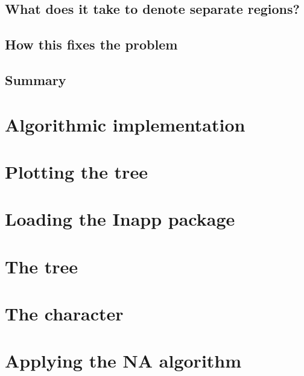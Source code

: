 \documentclass[]{book}
\theoremstyle{definition}
\theoremstyle{definition}
\theoremstyle{definition}
\theoremstyle{remark}
\begin{document}
\hypertarget{what-does-it-take-to-denote-separate-regions}{%
\subsection{What does it take to denote separate
regions?}\label{what-does-it-take-to-denote-separate-regions}}

\hypertarget{how-this-fixes-the-problem}{%
\subsection{How this fixes the
problem}\label{how-this-fixes-the-problem}}

\hypertarget{summary}{%
\subsection{Summary}\label{summary}}

\hypertarget{algorithm}{%
\section{Algorithmic implementation}\label{algorithm}}

\hypertarget{plotting-the-tree}{%
\section{Plotting the tree}\label{plotting-the-tree}}

\hypertarget{loading-the-inapp-package-1}{%
\section{Loading the Inapp package}\label{loading-the-inapp-package-1}}

\hypertarget{the-tree-1}{%
\section{The tree}\label{the-tree-1}}

\hypertarget{the-character-1}{%
\section{The character}\label{the-character-1}}

\hypertarget{applying-the-na-algorithm}{%
\section{Applying the NA algorithm}\label{applying-the-na-algorithm}}
\end{document}
